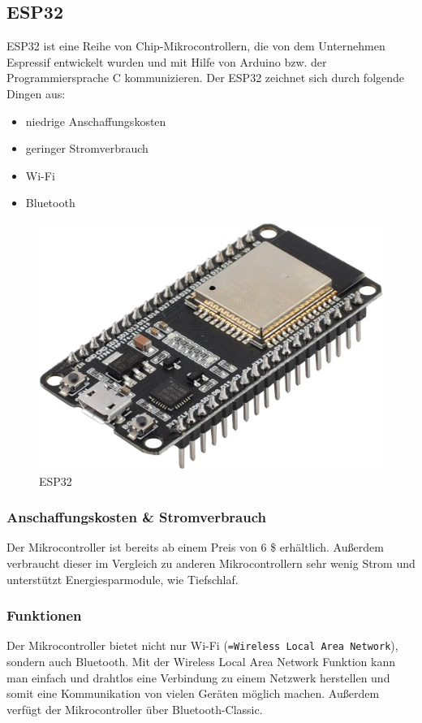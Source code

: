 \newpage
\subsection{ESP32} \label{ESP32}

ESP32 ist eine Reihe von Chip-Mikrocontrollern, die von dem Unternehmen Espressif entwickelt wurden und mit Hilfe von Arduino bzw. der Programmiersprache C kommunizieren. Der ESP32 \parencite{ESP32} zeichnet sich durch folgende Dingen aus:

\begin{itemize}
	\item niedrige Anschaffungskosten
	\item geringer Stromverbrauch
	\item Wi-Fi
	\item Bluetooth
\end{itemize}


\begin{figure}[H]
	\centering
	\includegraphics[width=0.7\linewidth]{images/ESP32.jpg}
	\caption[ESP32]{ESP32}
	\label{fig:ESP32}
\end{figure}

\subsubsection{Anschaffungskosten \& Stromverbrauch}

Der Mikrocontroller ist bereits ab einem Preis von 6 \$ erhältlich. Außerdem verbraucht dieser im Vergleich zu anderen Mikrocontrollern sehr wenig Strom und unterstützt Energiesparmodule, wie Tiefschlaf.

\subsubsection{Funktionen}

Der Mikrocontroller bietet nicht nur Wi-Fi (\texttt{=Wireless Local Area Network}), sondern auch Bluetooth. Mit der Wireless Local Area Network Funktion kann man einfach und drahtlos eine Verbindung zu einem Netzwerk herstellen und somit eine Kommunikation von vielen Geräten möglich machen. Außerdem verfügt der Mikrocontroller über Bluetooth-Classic.

